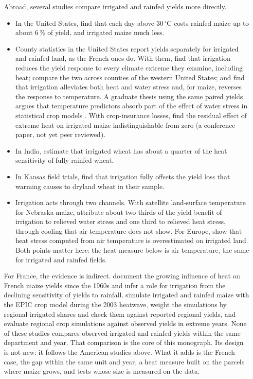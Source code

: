 Abroad, several studies compare irrigated and rainfed yields more directly.
\begin{itemize}
  \item In the United States, \textcite{schauberger2017} find that each day above 30\,$^{\circ}$C costs rainfed maize up to about 6\,\% of yield, and irrigated maize much less.
  \item County statistics in the United States report yields separately for irrigated and rainfed land, as the French ones do. With them, \textcite{troy2015} find that irrigation reduces the yield response to every climate extreme they examine, including heat; \textcite{li2018} compare the two across counties of the western United States; and \textcite{luan2021} find that irrigation alleviates both heat and water stress and, for maize, reverses the response to temperature. A graduate thesis using the same paired yields argues that temperature predictors absorb part of the effect of water stress in statistical crop models \parencite{hunter2026}. With crop-insurance losses, \textcite{pinto2026} find the residual effect of extreme heat on irrigated maize indistinguishable from zero (a conference paper, not yet peer reviewed).
  \item In India, \textcite{zaveri2019} estimate that irrigated wheat has about a quarter of the heat sensitivity of fully rainfed wheat.
  \item In Kansas field trials, \textcite{tack2017} find that irrigation fully offsets the yield loss that warming causes to dryland wheat in their sample.
  \item Irrigation acts through two channels. With satellite land-surface temperature for Nebraska maize, \textcite{zhu2022} attribute about two thirds of the yield benefit of irrigation to relieved water stress and one third to relieved heat stress, through cooling that air temperature does not show. For Europe, \textcite{siebert2017} show that heat stress computed from air temperature is overestimated on irrigated land. Both points matter here: the heat measure below is air temperature, the same for irrigated and rainfed fields.
\end{itemize}

For France, the evidence is indirect. \textcite{hawkins2013} document the growing influence of heat on French maize yields since the 1960s and infer a role for irrigation from the declining sensitivity of yields to rainfall. \textcite{vandervelde2010} simulate irrigated and rainfed maize with the EPIC crop model during the 2003 heatwave, weight the simulations by regional irrigated shares and check them against reported regional yields, and \textcite{vandervelde2012} evaluate regional crop simulations against observed yields in extreme years. None of these studies compares observed irrigated and rainfed yields within the same department and year. That comparison is the core of this monograph. Its design is not new: it follows the American studies above. What it adds is the French case, the gap within the same unit and year, a heat measure built on the parcels where maize grows, and tests whose size is measured on the data.

